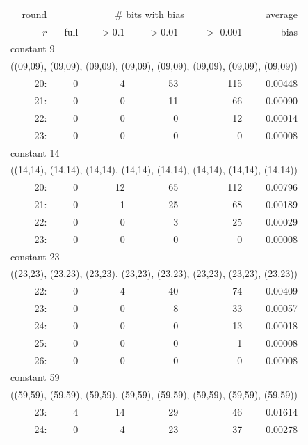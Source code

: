 \documentclass[11pt,twoside]{article}
\begin{document}
\begin{table}[htbp]
  \centering
\begin{tabular}{|r|rrrr|r|}
\hline
round & \multicolumn{ 4}{c|}{\# bits with bias} & average\\
$r$ & \quad full & $>0.1$ & $>0.01$ & $>$ 0.001 & bias \\ 
\hline\hline 
\multicolumn{6}{|l|}{constant 9} \\ 
\multicolumn{6}{|l|}{((09,09), (09,09), (09,09), (09,09),
                      (09,09), (09,09), (09,09), (09,09))} \\ 
 20: &  0 &  4 &  53 &  115 & 0.00448  \\
 21: &  0 &  0 &  11 &  66 & 0.00090  \\
 22: &  0 &  0 &  0 &  12 & 0.00014  \\
 23: &  0 &  0 &  0 &  0 & 0.00008  \\
\hline\hline
\multicolumn{6}{|l|}{constant 14} \\ 
\multicolumn{6}{|l|}{((14,14), (14,14), (14,14), (14,14), 
                      (14,14), (14,14), (14,14), (14,14))}\\
 20: &  0 &  12 &  65 &  112 & 0.00796  \\                                   
 21: &  0 &  1 &  25 &  68 & 0.00189  \\                                     
 22: &  0 &  0 &  3 &  25 & 0.00029  \\                                      
 23: &  0 &  0 &  0 &  0 & 0.00008  \\ 
\hline\hline
\multicolumn{6}{|l|}{constant 23} \\ 
\multicolumn{6}{|l|}{((23,23), (23,23), (23,23), (23,23),
	                    (23,23), (23,23), (23,23), (23,23))} \\ 
 22: &  0 &  4 &  40 &  74 & 0.00409  \\
 23: &  0 &  0 &  8 &  33 & 0.00057  \\
 24: &  0 &  0 &  0 &  13 & 0.00018  \\
 25: &  0 &  0 &  0 &  1 & 0.00008  \\
 26: &  0 &  0 &  0 &  0 & 0.00008  \\
\hline\hline
\multicolumn{6}{|l|}{constant 59} \\ 
\multicolumn{6}{|l|}{((59,59), (59,59), (59,59), (59,59),
                      (59,59), (59,59), (59,59), (59,59))} \\ 
 23: &  4 &  14 &  29 &  46 & 0.01614  \\
 24: &  0 &  4 &  23 &  37 & 0.00278  \\

\end{tabular}
\end{table}
\end{document}

